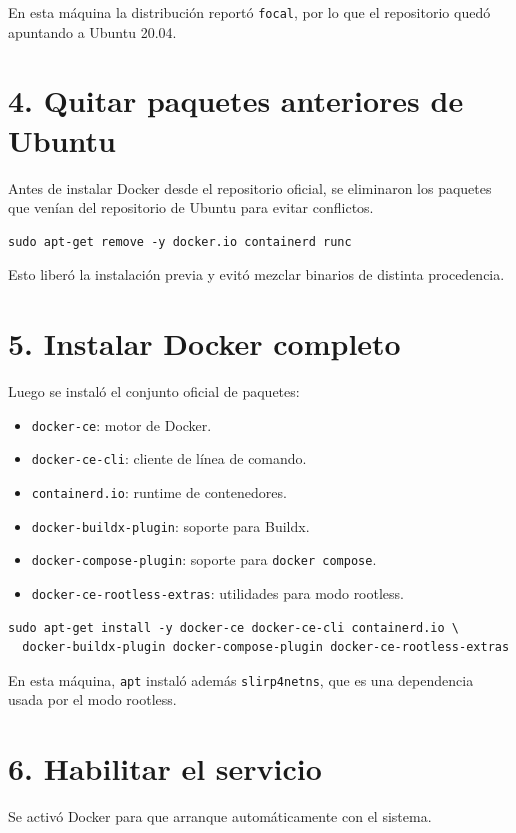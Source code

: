 \documentclass[12pt]{article}
\begin{document}
En esta máquina la distribución reportó \texttt{focal}, por lo que el repositorio quedó apuntando a Ubuntu 20.04.

\section*{4. Quitar paquetes anteriores de Ubuntu}
Antes de instalar Docker desde el repositorio oficial, se eliminaron los paquetes que venían del repositorio de Ubuntu para evitar conflictos.

\begin{verbatim}
sudo apt-get remove -y docker.io containerd runc
\end{verbatim}

Esto liberó la instalación previa y evitó mezclar binarios de distinta procedencia.

\section*{5. Instalar Docker completo}
Luego se instaló el conjunto oficial de paquetes:

\begin{itemize}[leftmargin=*]
  \item \texttt{docker-ce}: motor de Docker.
  \item \texttt{docker-ce-cli}: cliente de línea de comando.
  \item \texttt{containerd.io}: runtime de contenedores.
  \item \texttt{docker-buildx-plugin}: soporte para Buildx.
  \item \texttt{docker-compose-plugin}: soporte para \texttt{docker compose}.
  \item \texttt{docker-ce-rootless-extras}: utilidades para modo rootless.
\end{itemize}

\begin{verbatim}
sudo apt-get install -y docker-ce docker-ce-cli containerd.io \
  docker-buildx-plugin docker-compose-plugin docker-ce-rootless-extras
\end{verbatim}

En esta m\'aquina, \texttt{apt} instal\'o adem\'as \texttt{slirp4netns}, que es una dependencia usada por el modo rootless.

\section*{6. Habilitar el servicio}
Se activ\'o Docker para que arranque autom\'aticamente con el sistema.
\end{document}
